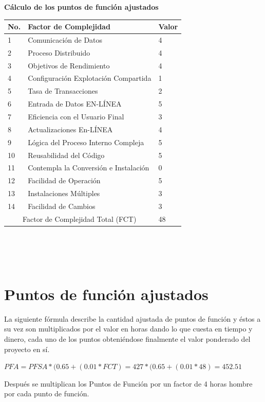 \documentclass[a4paper,12pt,openany,oneside]{book}
\begin{document}
\textbf{Cálculo de los puntos de función ajustados}\\
\begin{tabular}{| l | l | l |}
\hline
\textbf{No.} & \textbf{Factor de Complejidad} & \textbf{Valor}\\
\hline
1 &  Comunicación de Datos & 4 \\
\hline
2 &  Proceso Distribuido &4  \\
\hline
3 & Objetivos de Rendimiento  &4  \\
\hline
4 & Configuración Explotación Compartida  & 1 \\
\hline
5 & Tasa de Transacciones  & 2 \\
\hline
6 &  Entrada de Datos EN-LÍNEA &  5\\
\hline
7 & Eficiencia con el Usuario Final  &  3\\
\hline
8 & Actualizaciones En-LÍNEA  & 4 \\
\hline
9 & Lógica del Proceso Interno Compleja  &  5\\
\hline
10 & Reusabilidad del Código  &  5\\
\hline
11&  Contempla la Conversión e Instalación &  0\\
\hline
12& Facilidad de Operación  &  5\\
\hline
13& Instalaciones Múltiples  &  3\\
\hline
14& Facilidad de Cambios  & 3 \\
\hline
\multicolumn{2}{|c|}{Factor de Complejidad Total (FCT)} & 48\\
\hline
\end{tabular}
\\\\\\

\section{Puntos de función ajustados}
La siguiente fórmula describe la cantidad ajustada de puntos de función y éstos a su vez son multiplicados por el valor en horas dando lo que cuesta en tiempo y dinero, cada uno de los puntos obteniéndose finalmente el valor ponderado del proyecto en sí.

\begin{math}
PFA=PFSA * ( 0.65 + ( 0.01 * FCT ) = 427 * ( 0.65 + ( 0.01 * 48 ) = 452.51
\end{math}

Después se multiplican los Puntos de Función por un factor de 4 horas hombre por cada punto de función.
\end{document}
